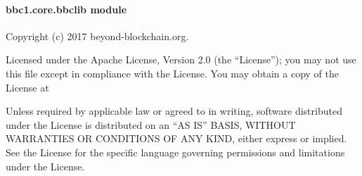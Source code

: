 \documentclass[letterpaper,10pt,english]{sphinxmanual}
\begin{document}
\begin{fulllineitems}
\begin{fulllineitems}
\label{\detokenize{bbc1.core.bbc_stats:bbc1.core.bbc_stats.BBcStats.update_stats}}
\end{fulllineitems}


\begin{fulllineitems}
\label{\detokenize{bbc1.core.bbc_stats:bbc1.core.bbc_stats.BBcStats.update_stats_decrement}}
\end{fulllineitems}


\begin{fulllineitems}
\label{\detokenize{bbc1.core.bbc_stats:bbc1.core.bbc_stats.BBcStats.update_stats_increment}}
\end{fulllineitems}


\end{fulllineitems}



\paragraph{bbc1.core.bbclib module}
\label{\detokenize{bbc1.core.bbclib::doc}}\label{\detokenize{bbc1.core.bbclib:bbc1-core-bbclib-module}}\label{\detokenize{bbc1.core.bbclib:module-bbc1.core.bbclib}}
Copyright (c) 2017 beyond-blockchain.org.

Licensed under the Apache License, Version 2.0 (the “License”);
you may not use this file except in compliance with the License.
You may obtain a copy of the License at
\begin{quote}

\end{quote}

Unless required by applicable law or agreed to in writing, software
distributed under the License is distributed on an “AS IS” BASIS,
WITHOUT WARRANTIES OR CONDITIONS OF ANY KIND, either express or implied.
See the License for the specific language governing permissions and
limitations under the License.
\end{document}
